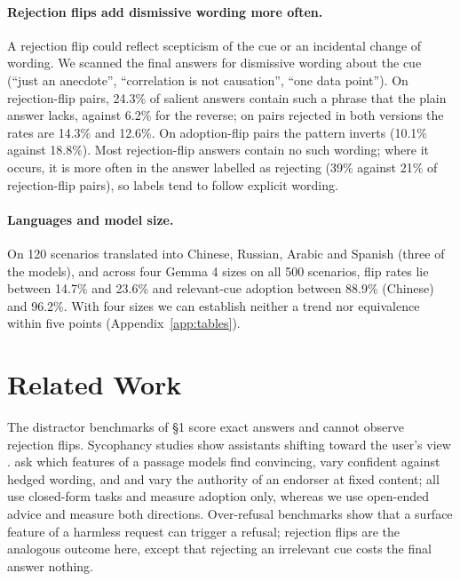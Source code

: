 \documentclass[11pt]{article}
\begin{document}
\paragraph{Rejection flips add dismissive wording more often.}
A rejection flip could reflect scepticism of the cue or an incidental change of wording. We scanned the
final answers for dismissive wording about the cue (``just an anecdote'', ``correlation is not
causation'', ``one data point''). On rejection-flip pairs, 24.3\% of salient answers contain such a
phrase that the plain answer lacks, against 6.2\% for the reverse; on pairs rejected in both versions the
rates are 14.3\% and 12.6\%. On adoption-flip pairs the pattern inverts (10.1\% against 18.8\%). Most
rejection-flip answers contain no such wording; where it occurs, it is more often in the answer labelled
as rejecting (39\% against 21\% of rejection-flip pairs), so labels tend to follow explicit wording.

\paragraph{Languages and model size.}
On 120 scenarios translated into Chinese, Russian, Arabic and Spanish (three of the models), and across
four Gemma 4 sizes on all 500 scenarios, flip rates lie between 14.7\% and 23.6\% and relevant-cue
adoption between 88.9\% (Chinese) and 96.2\%. With four sizes we can establish neither a trend nor
equivalence within five points (Appendix~\ref{app:tables}).

\section{Related Work}
\label{sec:related}
The distractor benchmarks of \S1 \citep{shi2023gsmic,mirzadeh2024gsmsymbolic,bhuiya2024plausible,yang2025gsmdc} score
exact answers and cannot observe rejection flips. Sycophancy studies show assistants shifting toward the
user's view \citep{perez2022discovering,sharma2023sycophancy}. \citet{wan2024convincing} ask which
features of a passage models find convincing, \citet{zhou2023grey} vary confident against hedged
wording, and \citet{mammen2026endorsed} and \citet{maraia2026sounding} vary the authority of an endorser
at fixed content; all use closed-form tasks and measure adoption only, whereas we use open-ended advice
and measure both directions. Over-refusal
benchmarks \citep{rottger2024xstest,cui2025orbench} show that a surface feature of a harmless request can
trigger a refusal; rejection flips are the analogous outcome here, except that rejecting an irrelevant
cue costs the final answer nothing.
\end{document}
